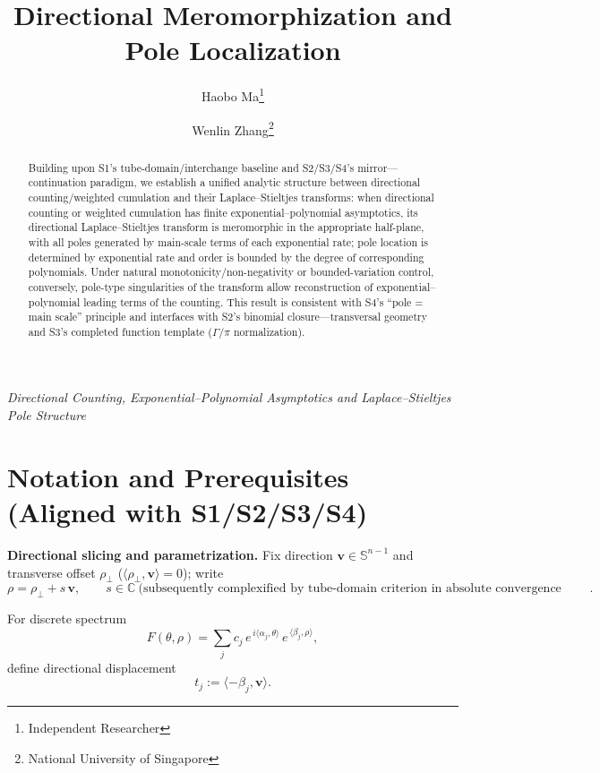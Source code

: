 \documentclass[11pt,a4paper]{article}
\title{Directional Meromorphization and Pole Localization}
\author{Haobo Ma\thanks{Independent Researcher} \and Wenlin Zhang\thanks{National University of Singapore}}
\date{}
\theoremstyle{remark}
\begin{document}
\maketitle

\begin{center}
\textit{Directional Counting, Exponential--Polynomial Asymptotics and Laplace--Stieltjes Pole Structure}
\end{center}

\begin{abstract}
Building upon S1's tube-domain/interchange baseline and S2/S3/S4's mirror---continuation paradigm, we establish a unified analytic structure between directional counting/weighted cumulation and their Laplace--Stieltjes transforms: when directional counting or weighted cumulation has finite exponential--polynomial asymptotics, its directional Laplace--Stieltjes transform is meromorphic in the appropriate half-plane, with all poles generated by main-scale terms of each exponential rate; pole location is determined by exponential rate and order is bounded by the degree of corresponding polynomials. Under natural monotonicity/non-negativity or bounded-variation control, conversely, pole-type singularities of the transform allow reconstruction of exponential--polynomial leading terms of the counting. This result is consistent with S4's ``pole = main scale'' principle and interfaces with S2's binomial closure---transversal geometry and S3's completed function template ($\Gamma/\pi$ normalization).
\end{abstract}

\section{Notation and Prerequisites (Aligned with S1/S2/S3/S4)}

\textbf{Directional slicing and parametrization.} Fix direction $\mathbf{v}\in\mathbb{S}^{n-1}$ and transverse offset $\rho_\perp$ ($\langle\rho_\perp,\mathbf{v}\rangle=0$); write
\begin{equation}
\rho=\rho_\perp+s\,\mathbf{v},\qquad s\in\mathbb{C}\ \text{(subsequently complexified by tube-domain criterion in absolute convergence half-plane)} .
\end{equation}

For discrete spectrum
\begin{equation}
F(\theta,\rho)=\sum_{j} c_j\,e^{\,i\langle\alpha_j,\theta\rangle}\,e^{\,\langle\beta_j,\rho\rangle},
\end{equation}
define directional displacement
\begin{equation}
t_j:=\langle-\beta_j,\mathbf{v}\rangle .
\end{equation}
\end{document}

